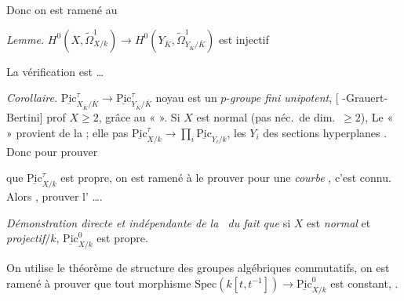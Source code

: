\documentclass[11pt,a4paper]{article}
\begin{document}
Donc on est ramené au

\emph{Lemme.} $H^0(X, \widetilde{\Omega}^1_{X/k}) \to H^0(Y_{\overline{K}}, \widetilde{\Omega}^1_{Y_{\overline{K}}/\overline{K}})$ est injectif

La vérification est   …

\emph{Corollaire.} $\underline{\mathrm{Pic}}^{\tau}_{X_{\overline{K}}/\overline{K}} \to \underline{\mathrm{Pic}}^{\tau}_{Y_{\overline{K}}/\overline{K}}$   noyau  est un $p$-\emph{groupe fini unipotent}, [         -Grauert-Bertini]  prof $X \geqslant 2$, grâce au « \ill{} \ill{} \ill{} ». Si $X$ est normal (pas néc.\ de dim.\ $\geqslant 2$),  Le « \ill{}   » provient de la  ; elle  pas \ill{} \ill{}  \ill{} \emph{} \emph{} $\underline{\mathrm{Pic}}^{\tau}_{X/k} \to \prod_i \underline{\mathrm{Pic}}_{Y_i/k}$, les $Y_i$ des sections hyperplanes  . Donc pour prouver

que $\underline{\mathrm{Pic}}^{\tau}_{X/k}$ est propre, on est ramené à le prouver pour une \emph{courbe} ,  c'est connu. Alors        ,     prouver l' ….

\emph{Démonstration directe et indépendante de la \ du fait que} si $X$ est  \emph{normal} et \emph{projectif}$/k$, \struck{\ill{}} $\underline{\mathrm{Pic}}^{0}_{X/k}$ est propre.

On utilise le théorème de structure des groupes algébriques commutatifs, on est ramené à prouver que tout morphisme $\mathrm{Spec}(k[t, t^{-1}]) \to \underline{\mathrm{Pic}}^{0}_{X/k}$ est constant, .
\end{document}
